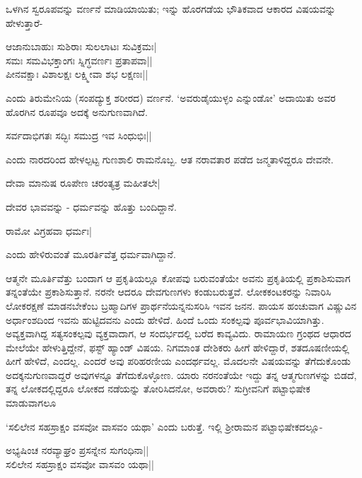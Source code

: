 ಒಳಗಿನ ಸ್ವರೂಪವನ್ನು ವರ್ಣನೆ ಮಾಡಿಯಾಯಿತು; ಇನ್ನು ಹೊರಗಡೆಯ ಭೌತಿಕವಾದ ಆಕಾರದ ವಿಷಯವನ್ನು ಹೇಳುತ್ತಾರೆ-

\begin{shloka}
ಆಜಾನುಬಾಹುಃ ಸುಶಿರಾಃ ಸುಲಲಾಟಃ ಸುವಿಕ್ರಮಃ|\\
ಸಮಃ ಸಮವಿಭಕ್ತಾಂಗಃ ಸ್ನಿಗ್ಧವರ್ಣಃ ಪ್ರತಾಪವಾ||\\
ಪೀನವಕ್ಷಾಃ ವಿಶಾಲಕ್ಷಃ ಲಕ್ಷ್ಮೀವಾ ಶಭ ಲಕ್ಷಣಃ||
\end{shloka}

ಎಂದು ತಿರುಮೇನಿಯ (ಸಂಪದ್ಯುಕ್ತ ಶರೀರದ) ವರ್ಣನೆ. `ಅವರುಡೈಯುಳ್ಳಂ ಎನ್ನುಂಡೋ' ಅದಾಯಿತು ಅವರ ಹೊರಗಿನ ರೂಪವೂ ಅದಕ್ಕೆ ಅನುಗುಣವಾಗಿದೆ.

\begin{shloka}
ಸರ್ವದಾಭಿಗತಃ ಸದ್ಭಿಃ ಸಮುದ್ರ ಇವ ಸಿಂಧುಭಿಃ||
\end{shloka}

ಎಂದು ನಾರದರಿಂದ ಹೇಳಲ್ಪಟ್ಟ ಗುಣಶಾಲಿ ರಾಮನೊಬ್ಬ. ಆತ ನರಾವತಾರ ಪಡೆದ ಜನ್ಮತಾಳಿದ್ದರೂ ದೇವನೇ. 

\begin{shloka}
ದೇವಾ ಮಾನುಷ ರೂಪೇಣ ಚರಂತ್ಯತ್ರ ಮಹೀತಲೇ|
\end{shloka}

ದೇವರ ಭಾವವನ್ನು - ಧರ್ಮವನ್ನು ಹೊತ್ತು ಬಂದಿದ್ದಾನೆ.

\begin{shloka}
ರಾಮೋ ವಿಗ್ರಹವಾ ಧರ್ಮಃ|
\end{shloka}

ಎಂದು ಹೇಳಿರುವಂತೆ ಮೂರರ್ತಿವೆತ್ತ ಧರ್ಮವಾಗಿದ್ದಾನೆ.

ಆತ್ಮನೇ ಮೂರ್ತಿವೆತ್ತು ಬಂದಾಗ ಆ ಪ್ರಕೃತಿಯಲ್ಲೂ ಕೋಪವು ಬರುವಂತೆಯೇ ಅವನು ಪ್ರಕೃತಿಯಲ್ಲಿ ಪ್ರಕಾಶಿಸುವಾಗ ತನ್ನಂತೆಯೇ ಪ್ರಕಾಶಿಸುತ್ತಾನೆ. ನರನೇ ಆದರೂ ದೇವಗುಣಗಳು ಕಂಡುಬರುತ್ತವೆ. ಲೋಕಕಂಟಕರನ್ನು ನಿವಾರಿಸಿ ಲೋಕರಕ್ಷಣೆ ಮಾಡನಬೇಕೆಂಬ ಬ್ರಹ್ಮಾದಿಗಳ ಪ್ರಾರ್ಥನೆಯನ್ನನುಸರಿಸಿ ಇವನ ಜನನ. ಪಾಯಸ ಹಂಚುವಾಗ ವಿಷ್ಣುವಿನ ಅರ್ಧಾಂಶದಿಂದ ಇವನು ಹುಟ್ಟಿದವನು ಎಂದು ಹೇಳಿದೆ. ಹಿಂದೆ ಒಂದು ಸಂಕಲ್ಪವು ಪೂರ್ವಭಾವಿಯಾಗಿತ್ತು. ಅವ್ಯಕ್ತವಾಗಿದ್ದ ಸತ್ಯಸಂಕಲ್ಪವು ವ್ಯಕ್ತವಾದಾಗ, ಆ ಸಂದರ್ಭದಲ್ಲಿ ಬರೆದ ಕಾವ್ಯವಿದು. ರಾಮಾಯಣ ಗ್ರಂಥದ ಆಧಾರದ ಮೇಲೆಯೇ ಹೇಳುತ್ತಿದ್ದೇನೆ, ಫಸ್ಟ್ ಹ್ಯಾಂಡ್ ವಿಷಯ. ನಿಗಮಾಂತ ದೇಶಿಕರು ಹೀಗೆ ಹೇಳಿದ್ದಾರೆ, ಶತದೂಷಣೀಯಲ್ಲಿ ಹೀಗೆ ಹೇಳಿದೆ, ಎಂದಲ್ಲ. ಎಂದರೆ ಅವು ಪರಿಹರಣೀಯ ಎಂದರ್ಥವಲ್ಲ. ಮೊದಲನೇ ವಿಷಯವನ್ನು ತೆಗೆದುಕೊಂಡು ಅದಕ್ಕನುಗುಣವಾದ್ದರೆ ಅವುಗಳನ್ನೂ ತೆಗೆದುಕೊಳ್ಳೋಣ. ಯಾರು ನರನಂತೆಯೇ ಇದ್ದು ತನ್ನ ಆತ್ಮಗುಣಗಳನ್ನು ಬಿಡದೆ, ತನ್ನ ಲೋಕದಲ್ಲಿದ್ದರೂ ಲೋಕದ ನಡೆಯನ್ನು ತೋರಿಸಿದನೋ, ಅವರಾರು? ಸುಗ್ರೀವನಿಗೆ ಪಟ್ಟಾಭಿಷೇಕ ಮಾಡುವಾಗಲೂ

`ಸಲಿಲೇನ ಸಹಸ್ರಾಕ್ಷಂ ವಸವೋ ವಾಸವಂ ಯಥಾ' ಎಂದು ಬರುತ್ತೆ. ಇಲ್ಲಿ ಶ್ರೀರಾಮನ ಪಟ್ಟಾಭಿಷೇಕದಲ್ಲೂ-

\begin{shloka}
ಅಭ್ಯಷಿಂಚ ನರವ್ಯಾಘ್ರಂ ಪ್ರಸನ್ನೇನ ಸುಗಂಧಿನಾ||\\
ಸಲಿಲೇನ ಸಹಸ್ರಾಕ್ಷಂ ವಸವೋ ವಾಸವಂ ಯಥಾ||
\end{shloka}


